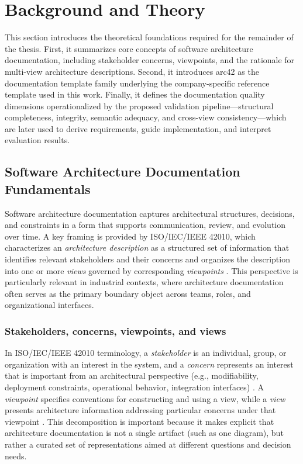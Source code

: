 \section{Background and Theory}
This section introduces the theoretical foundations required for the remainder of the thesis. First, it summarizes core concepts of software architecture documentation, including stakeholder concerns, viewpoints, and the rationale for multi-view architecture descriptions. Second, it introduces arc42 as the documentation template family underlying the company-specific reference template used in this work. Finally, it defines the documentation quality dimensions operationalized by the proposed validation pipeline—structural completeness, integrity, semantic adequacy, and cross-view consistency—which are later used to derive requirements, guide implementation, and interpret evaluation results.

\subsection{Software Architecture Documentation Fundamentals}
Software architecture documentation captures architectural structures, decisions, and constraints in a form that supports communication, review, and evolution over time. A key framing is provided by ISO/IEC/IEEE 42010, which characterizes an \emph{architecture description} as a structured set of information that identifies relevant stakeholders and their concerns and organizes the description into one or more \emph{views} governed by corresponding \emph{viewpoints} \cite{iso42010,iso_architecture_ads}. This perspective is particularly relevant in industrial contexts, where architecture documentation often serves as the primary boundary object across teams, roles, and organizational interfaces.

\subsubsection{Stakeholders, concerns, viewpoints, and views}
In ISO/IEC/IEEE 42010 terminology, a \emph{stakeholder} is an individual, group, or organization with an interest in the system, and a \emph{concern} represents an interest that is important from an architectural perspective (e.g., modifiability, deployment constraints, operational behavior, integration interfaces) \cite{iso42010,iso_architecture_ads}. A \emph{viewpoint} specifies conventions for constructing and using a view, while a \emph{view} presents architecture information addressing particular concerns under that viewpoint \cite{iso42010}. This decomposition is important because it makes explicit that architecture documentation is not a single artifact (such as one diagram), but rather a curated set of representations aimed at different questions and decision needs.


